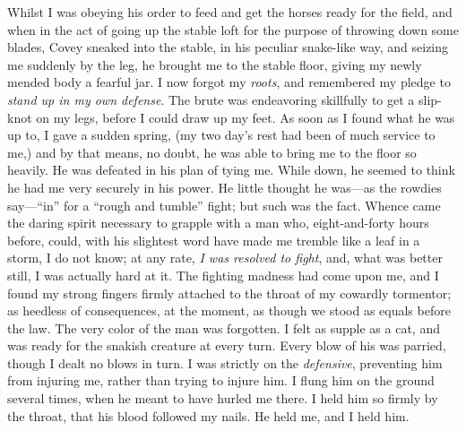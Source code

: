 Whilst I was obeying his order to feed and get the horses ready for the
field, and when in the act of going up the stable loft for the purpose
of throwing down some blades, Covey sneaked into the stable, in his
{}peculiar snake-like way, and seizing me suddenly by the leg, he
brought me to the stable floor, giving my newly mended body a fearful
jar. I now forgot my \emph{roots}, and remembered my pledge to
\emph{stand up in my own defense}. The brute was endeavoring skillfully
to get a slip-knot on my legs, before I could draw up my feet. As soon
as I found what he was up to, I gave a sudden spring, (my two day's rest
had been of much service to me,) and by that means, no doubt, he was
able to bring me to the floor so heavily. He was defeated in his plan of
tying me. While down, he seemed to think he had me very securely in his
power. He little thought he was---as the rowdies say---``in'' for a
``rough and tumble'' fight; but such was the fact. Whence came the
daring spirit necessary to grapple with a man who, eight-and-forty hours
before, could, with his slightest word have made me tremble like a leaf
in a storm, I do not know; at any rate, \emph{I was resolved to fight},
and, what was better still, I was actually hard at it. The fighting
madness had come upon me, and I found my strong fingers firmly attached
to the throat of my cowardly tormentor; as heedless of consequences, at
the moment, as though we stood as equals before the law. The very color
of the man was forgotten. I felt as supple as a cat, and was ready for
the snakish creature at every turn. Every blow of his was parried,
though I dealt no blows in turn. I was strictly on the \emph{defensive},
preventing him from injuring me, rather than trying to injure him. I
flung him on the ground several times, when he meant to have hurled me
there. I held him {}so firmly by the throat, that his blood followed my
nails. He held me, and I held him.

